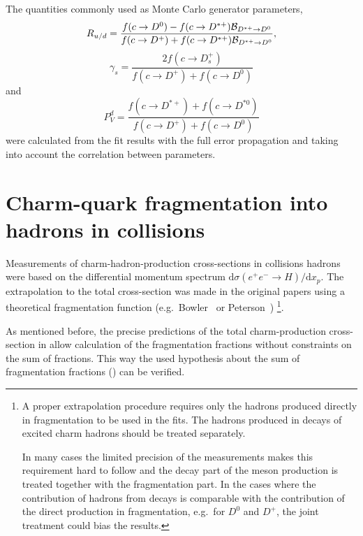 The quantities commonly used as Monte Carlo generator parameters,
$$
R_{u/d} =\frac{
f(c\rightarrow D^{0})
-f(c\rightarrow D^{*+}){\cal B}_{D^{*+}\rightarrow D^0} 
}
{
f(c\rightarrow D^{+})
+f(c\rightarrow D^{*+}){\cal B}_{D^{*+}\rightarrow D^0} 
},
$$
$$
\gamma_{s}=\frac{2f(c\rightarrow D^+_{s})}{f(c\rightarrow D^+)+
f(c\rightarrow D^0)}
$$ 
and 
$$
P^d_{V} =\frac{f(c\rightarrow D^{*+})+f(c\rightarrow D^{*0})}
{f(c\rightarrow D^{+})+f(c\rightarrow D^{0})}
$$
were calculated from the fit results with the full error propagation and
taking into account the correlation between parameters.
\FloatBarrier
\section{Charm-quark fragmentation into hadrons in {\pmb \epem} 
collisions}
Measurements of charm-hadron-production cross-sections in \epem 
collisions hadrons were based on the differential momentum spectrum 
$\mathrm{d}\sigma(e^+e^- \rightarrow H)/\mathrm{d}x_p.$
%
The extrapolation to
the total cross-section was made in the original papers
using a theoretical
fragmentation function (e.g.\ Bowler~\cite{Bowler:1981sb} or 
Peterson~\cite{Peterson:1982ak}) 
\footnote{A proper extrapolation procedure requires 
only the  hadrons produced directly in fragmentation to be used in the 
fits. 
%
The hadrons produced in decays of excited charm hadrons should be 
treated separately.
 
%
In many cases the limited precision of the measurements 
makes this requirement hard to follow and the decay part of the meson 
production is treated together with the fragmentation part. 
%
In the cases 
where the contribution of hadrons from decays is comparable with the 
contribution of the direct production in fragmentation, e.g.\ for $D^0$ 
and $D^+$, the joint treatment could bias the results.
}. 

As mentioned before, the precise predictions of the total 
charm-production cross-section in \epem allow calculation of
 the fragmentation
 fractions without constraints on the sum of fractions.
%
This way the used hypothesis about the sum of fragmentation fractions 
() can be verified.
